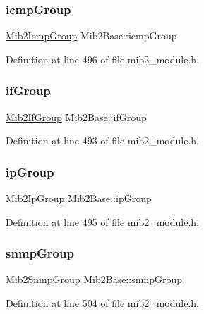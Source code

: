 \subsubsection{\texorpdfstring{icmp\+Group}{icmpGroup}}
{\footnotesize\ttfamily \hyperlink{structMib2IcmpGroup}{Mib2\+Icmp\+Group} Mib2\+Base\+::icmp\+Group}



Definition at line 496 of file mib2\+\_\+module.\+h.

\mbox{\label{structMib2Base_a92cba5dc8bb69c688aafa669a27442a4}} 
\subsubsection{\texorpdfstring{if\+Group}{ifGroup}}
{\footnotesize\ttfamily \hyperlink{structMib2IfGroup}{Mib2\+If\+Group} Mib2\+Base\+::if\+Group}



Definition at line 493 of file mib2\+\_\+module.\+h.

\mbox{\label{structMib2Base_a7561ab2eccf3803abaa847c4c97476a3}} 
\subsubsection{\texorpdfstring{ip\+Group}{ipGroup}}
{\footnotesize\ttfamily \hyperlink{structMib2IpGroup}{Mib2\+Ip\+Group} Mib2\+Base\+::ip\+Group}



Definition at line 495 of file mib2\+\_\+module.\+h.

\mbox{\label{structMib2Base_ad154f98112579f2ac3c0beac3417e520}} 
\subsubsection{\texorpdfstring{snmp\+Group}{snmpGroup}}
{\footnotesize\ttfamily \hyperlink{structMib2SnmpGroup}{Mib2\+Snmp\+Group} Mib2\+Base\+::snmp\+Group}



Definition at line 504 of file mib2\+\_\+module.\+h.

